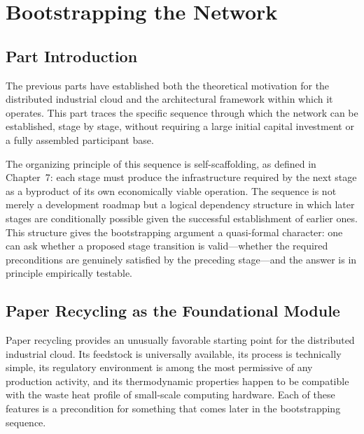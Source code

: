 \documentclass[12pt]{book}
\theoremstyle{definition}
\theoremstyle{remark}
\begin{document}
\part{Bootstrapping the Network}

\chapter*{Part Introduction}

The previous parts have established both the theoretical motivation
for the distributed industrial cloud and the architectural framework
within which it operates. This part traces the specific sequence
through which the network can be established, stage by stage, without
requiring a large initial capital investment or a fully assembled
participant base.

The organizing principle of this sequence is self-scaffolding, as
defined in Chapter~7: each stage must produce the infrastructure
required by the next stage as a byproduct of its own economically
viable operation. The sequence is not merely a development roadmap
but a logical dependency structure in which later stages are
conditionally possible given the successful establishment of earlier
ones. This structure gives the bootstrapping argument a quasi-formal
character: one can ask whether a proposed stage transition is
valid---whether the required preconditions are genuinely satisfied
by the preceding stage---and the answer is in principle empirically
testable.

\chapter{Paper Recycling as the Foundational Module}

Paper recycling provides an unusually favorable starting point for the
distributed industrial cloud. Its feedstock is universally available,
its process is technically simple, its regulatory environment is
among the most permissive of any production activity, and its
thermodynamic properties happen to be compatible with the waste heat
profile of small-scale computing hardware. Each of these features
is a precondition for something that comes later in the bootstrapping
sequence.
\end{document}
